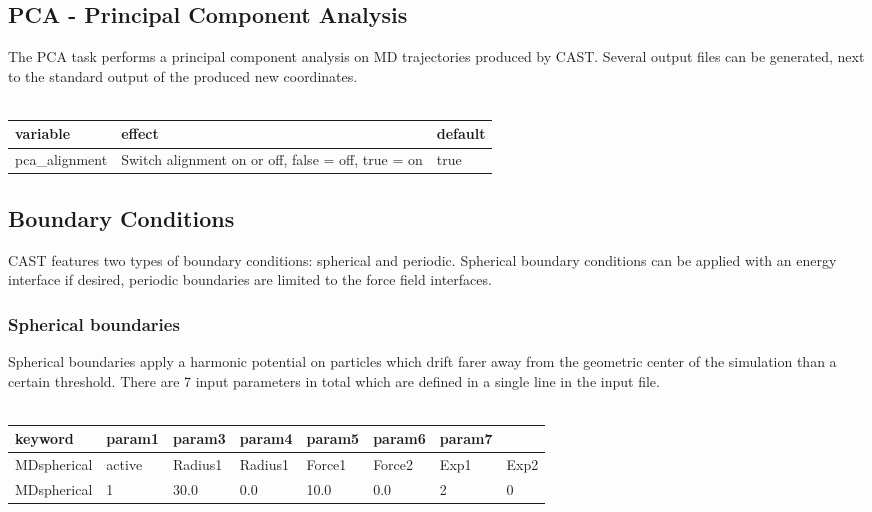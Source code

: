 \documentclass[10pt,a4paper]{article} %
\newif\ifdevmode %
\begin{document}
	\subsection{PCA - Principal Component Analysis}
	The PCA task performs a principal component analysis on MD trajectories produced by CAST. Several output files can be generated, next to the standard output of the produced new coordinates. \\~\\

	\begin{tabularx}{\textwidth}{l|X|X}
		variable & effect & default  \\
		\hline
		pca_alignment & Switch alignment on or off, false = off, true = on & true\\

	\end{tabularx}
	\ifdevmode
	\colorbox{red}{HERE IS STILL WORK TO BE DONE}
	\fi

	\subsection{Boundary Conditions}

	\ifdevmode \colorbox{red}{We should put this section somewhere else, not as a subsection of TASKS...} \fi

	CAST features two types of boundary conditions: spherical and periodic. Spherical boundary conditions can be applied with an energy interface if desired, periodic boundaries are limited to the force field interfaces.

	\subsubsection{Spherical boundaries}
	Spherical boundaries apply a harmonic potential on particles which drift farer away from the geometric center of the simulation than a certain threshold. There are 7 input parameters in total which are defined in a single line in the input file. \\~\\

	\begin{tabularx}{\textwidth}{l|X|X|X|X|X|X|X}
		keyword & param1 & param3 & param4 & param5 & param6 & param7 \\
		\hline
		MDspherical & active & Radius1 & Radius1 & Force1 & Force2 & Exp1 & Exp2 \\
		MDspherical & 1 & 30.0 & 0.0 & 10.0 & 0.0 & 2 & 0 \\
	\end{tabularx}~\\
\end{document}
